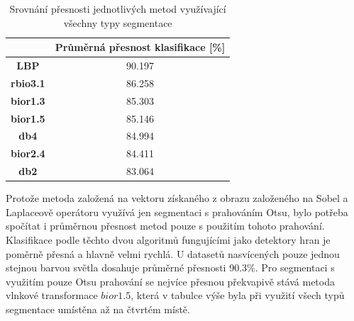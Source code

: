 \capstartfalse
\begin{table}[!htbp]
\centering
\begin{tabular}{|c|c|}
\hline
                 & \textbf{Průměrná přesnost klasifikace {[}\%{]}} \\ \hline
\textbf{LBP}     & 90.197                                         \\ \hline
\textbf{rbio3.1} & 86.258                                         \\ \hline
\textbf{bior1.3} & 85.303                                         \\ \hline
\textbf{bior1.5} & 85.146                                         \\ \hline
\textbf{db4}     & 84.994                                         \\ \hline
\textbf{bior2.4} & 84.411                                         \\ \hline
\textbf{db2}     & 83.064                                         \\ \hline
\end{tabular}
\caption{Srovnání přesnosti jednotlivých metod využívající všechny typy segmentace}
\end{table}
\capstarttrue

Protože metoda založená na vektoru získaného z obrazu založeného na Sobel a Laplaceově operátoru využívá jen segmentaci s prahováním Otsu, bylo potřeba spočítat i průměrnou přesnost metod pouze s použitím tohoto prahování. Klasifikace podle těchto dvou algoritmů fungujícími jako detektory hran je poměrně přesná a hlavně velmi rychlá. U datasetů nasvícených pouze jednou stejnou barvou světla dosahuje průměrné přesnosti 90.3\%. Pro segmentaci s využitím pouze Otsu prahování se nejvíce přesnou překvapivě stává metoda vlnkové transformace $bior1.5$, která v tabulce výše byla při využití všech typů segmentace umístěna až na čtvrtém místě.

